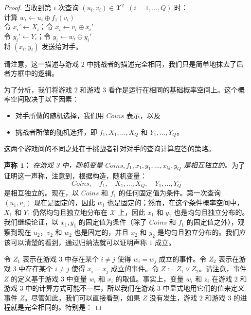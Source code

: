 \begin{proof}
\hspace*{5pt} 当收到第 $i$ 次查询 $(u_i,v_i)\in\mathcal{X}^2\;\;(i=1,\dots,Q)$ 时：\\
\hspace*{50pt} 计算 $w_i\leftarrow u_i\oplus f_1(v_i)$\\
\hspace*{50pt} 令 $x_i'\leftarrow X_i$；令 $x_i\leftarrow v_i\oplus x_i'$\\
\hspace*{50pt} 令 $y_i'\leftarrow Y_i$；令 $y_i\leftarrow w_i\oplus y_i'$\\
\hspace*{50pt} 将 $(x_i,y_i)$ 发送给对手。

\vspace{10pt}

请注意，这一描述与游戏 $2$ 中挑战者的描述完全相同，我们只是简单地抹去了后者方框中的逻辑。

为了分析，我们将游戏 $2$ 和游戏 $3$ 看作是运行在相同的基础概率空间上。这个概率空间取决于以下因素：
\begin{itemize}
	\item 对手所做的随机选择，我们用 $\mathit{Coins}$ 表示，以及
	\item 挑战者所做的随机选择，即 $f_1,X_1,\dots,X_Q$ 和 $Y_1,\dots,Y_Q$。
\end{itemize}
这两个游戏间的不同之处在于挑战者针对对手的查询计算应答的策略。

\vspace{5pt}

\noindent
\textbf{声称 $\mathbf{1}$：}
\emph{在游戏 3 中，随机变量 $\mathit{Coins},f_1,x_1,y_1,\dots,x_Q,y_Q$ 是相互独立的。}为了证明这一声称，注意到，根据构造，随机变量：
\[
\mathit{Coins},\quad
f_1,\quad
X_1,\dots,X_Q,\quad
Y_1,\dots,Y_Q
\]
是相互独立的。现在，以 $\mathit{Coins}$ 和 $f_1$ 的任何固定值为条件。第一次查询 $(u_1,v_1)$ 现在是固定的，因此 $w_1$ 也是固定的；然而，在这个条件概率空间中，$X_1$ 和 $Y_1$ 仍然均匀且独立地分布在 $\mathcal{X}$ 上，因此 $x_1$ 和 $y_1$ 也是均匀且独立分布的。我们继续论证，以 $x_1,y_1$ 的固定值为条件（除了 $\mathit{Coins}$ 和 $f_1$ 的固定值之外），观察到现在 $u_2$，$v_2$ 和 $w_2$ 也是固定的，并且 $x_2$ 和 $y_2$ 是均匀且独立分布的。我们应该可以清楚的看到，通过归纳法就可以证明声称 $1$ 成立。

令 $Z_1$ 表示在游戏 $3$ 中存在某个 $i\neq j$ 使得 $w_i=w_j$ 成立的事件。令 $Z_2$ 表示在游戏 $3$ 中存在某个 $i\neq j$ 使得 $x_i=x_j$ 成立的事件。令 $Z:=Z_1\lor Z_2$。请注意，事件 $Z$ 的定义基于游戏 $3$ 中变量 $w_i$ 和 $x_i$ 的取值。事实上，变量 $w_i$ 和 $z_i$ 在游戏 $2$ 和游戏 $3$ 中的计算方式可能不一样，所以我们在游戏 $3$ 中显式地用它们的值来定义事件 $Z$。尽管如此，我们可以直接看到，如果 $Z$ 没有发生，游戏 $2$ 和游戏 $3$ 的进程就是完全相同的。特别是：


\end{proof}
